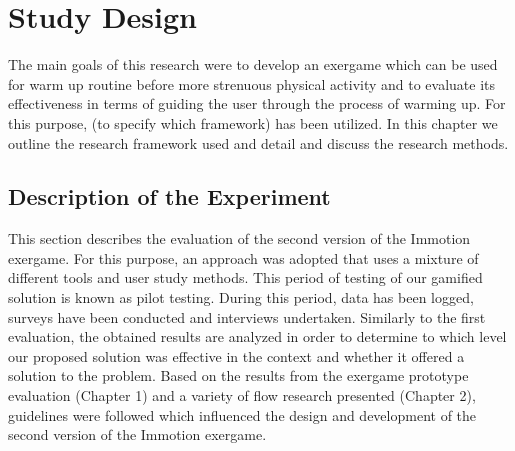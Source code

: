 \chapter{Study Design}\label{chapter:studydesign}
The main goals of this research were to develop an exergame which can be used for warm up routine before more strenuous physical activity and to evaluate its effectiveness in terms of guiding the user through the process of warming up. For this purpose, (to specify which framework) has been utilized.  In this chapter we outline the research framework used and detail and discuss the research methods. 
\section{Description of the Experiment}
This section describes the evaluation of the second version of the Immotion exergame. For this purpose, an approach was adopted that uses a mixture of different tools and user study methods. This period of testing of our gamified solution is known as pilot testing. During this period, data has been logged, surveys have been conducted and interviews undertaken. Similarly to the first evaluation, the obtained results are analyzed in order to determine to which level our proposed solution was effective in the context and whether it offered a solution to the problem. Based on the results from the exergame prototype evaluation (Chapter 1) and a variety of flow research presented (Chapter 2), guidelines were followed which influenced the design and development of the second version of the Immotion exergame. 

